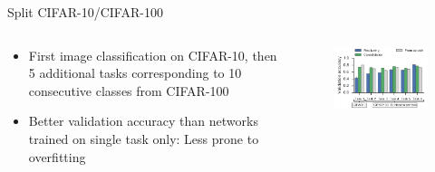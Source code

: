 \documentclass{beamer}
\begin{document}
\begin{frame}{Split CIFAR-10/CIFAR-100}
\begin{columns}
	\begin{column}{0.5\textwidth}
		\begin{itemize}
			\item First image classification on CIFAR-10, then 5 additional tasks  corresponding to 10 consecutive classes from CIFAR-100
			\item Better validation accuracy than networks trained on single task only: Less prone to overfitting
		\end{itemize}
	\end{column}
	\begin{column}{0.5\textwidth}
		\begin{figure}
			
			\centering
			\includegraphics[width=\textwidth]{ML4}
		\end{figure}
	\end{column}
\end{columns}

\end{frame}
\end{document}
